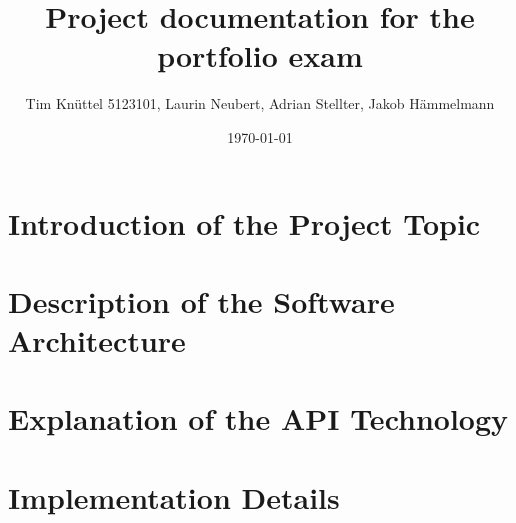 \documentclass[a4paper, 11pt]{article}
\title{Project documentation for the portfolio exam}
\date{\today}
\author{Tim Knüttel  5123101, Laurin Neubert, Adrian Stellter, Jakob Hämmelmann}
\begin{document}
\maketitle

\section{Introduction of the Project Topic}


\section{Description of the Software Architecture}


\section{Explanation of the API Technology}


\section{Implementation Details}
\end{document}

